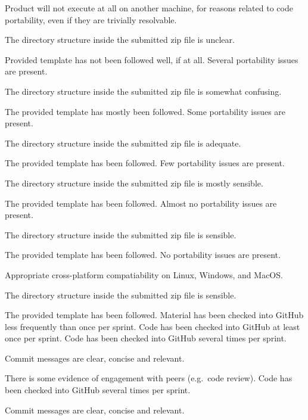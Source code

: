 \documentclass{../fal_assignment}
\begin{document}
\begin{markingrubric}
%
        \grade\fail Product will not execute at all on another machine, for reasons related to code portability, even if they are trivially resolvable.
            \par The directory structure inside the submitted zip file is unclear.
            \par Provided template has not been followed well, if at all.
        \grade Several portability issues are present.
            \par The directory structure inside the submitted zip file is somewhat confusing.
            \par The provided template has mostly been followed.
        \grade Some portability issues are present.
            \par The directory structure inside the submitted zip file is adequate.
            \par The provided template has been followed.
        \grade Few portability issues are present.
            \par The directory structure inside the submitted zip file is mostly sensible.
            \par The provided template has been followed.
        \grade Almost no portability issues are present.
            \par The directory structure inside the submitted zip file is sensible.
            \par The provided template has been followed.
        \grade No portability issues are present.
            \par Appropriate cross-platform compatiability on Linux, Windows, and MacOS.
            \par The directory structure inside the submitted zip file is sensible.
            \par The provided template has been followed.
%
        \grade \fail Material has been checked into GitHub less frequently than once per sprint.
        \grade Code has been checked into GitHub at least once per sprint.
        \grade Code has been checked into GitHub several times per sprint.
            \par Commit messages are clear, concise and relevant.
            \par There is some evidence of engagement with peers (e.g.\ code review).
        \grade Code has been checked into GitHub several times per sprint.
            \par Commit messages are clear, concise and relevant.

\end{markingrubric}
\end{document}
